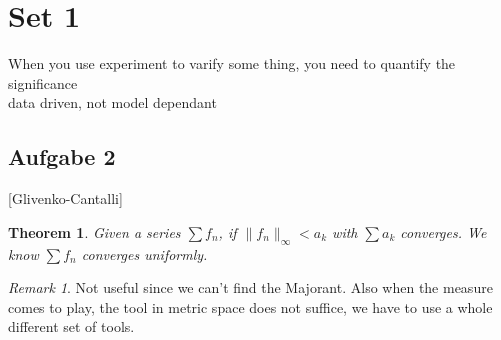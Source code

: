 \documentclass[a4paper,11pt]{article}
\newtheorem{theorem}{Theorem}[section]
\theoremstyle{definition}
\theoremstyle{remark}
\newtheorem*{remark}{Remark}
\begin{document}


\section*{Set 1}
When you use experiment to varify some thing, you need to quantify the significance\\
data driven, not model dependant
\subsection*{Aufgabe 2}[Glivenko-Cantalli]
\begin{theorem}
	Given a series $\sum f_n$, if $\| f_n \|_\infty < a_k$ with $\sum a_k$ converges. We know $\sum f_n$ converges uniformly. 
\end{theorem}
\begin{remark}
Not useful since we can't find the Majorant. Also when the measure comes to play, the tool in metric space does not suffice, we have to use a whole different set of tools. 	
\end{remark}
\end{document}
